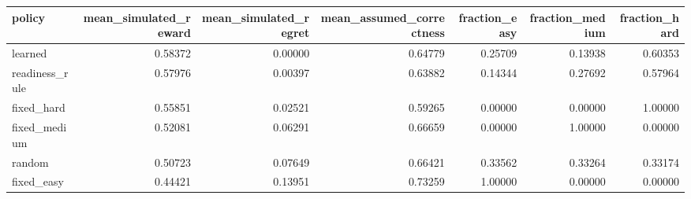 \begin{tabular}{lrrrrrr}
\toprule
policy & mean\_simulated\_reward & mean\_simulated\_regret & mean\_assumed\_correctness & fraction\_easy & fraction\_medium & fraction\_hard \\
\midrule
learned & 0.58372 & 0.00000 & 0.64779 & 0.25709 & 0.13938 & 0.60353 \\
readiness\_rule & 0.57976 & 0.00397 & 0.63882 & 0.14344 & 0.27692 & 0.57964 \\
fixed\_hard & 0.55851 & 0.02521 & 0.59265 & 0.00000 & 0.00000 & 1.00000 \\
fixed\_medium & 0.52081 & 0.06291 & 0.66659 & 0.00000 & 1.00000 & 0.00000 \\
random & 0.50723 & 0.07649 & 0.66421 & 0.33562 & 0.33264 & 0.33174 \\
fixed\_easy & 0.44421 & 0.13951 & 0.73259 & 1.00000 & 0.00000 & 0.00000 \\
\bottomrule
\end{tabular}
